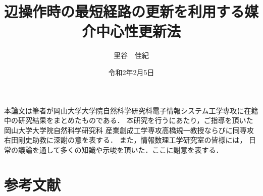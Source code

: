 \documentclass[11pt]{jreport}
\title{辺操作時の最短経路の更新を利用する媒介中心性更新法}
\author{里谷　佳紀}
\date{令和2年2月5日} %
\theoremstyle{mythmstyle}
\begin{document}
\maketitle








\acknowledgment
本論文は筆者が岡山大学大学院自然科学研究科電子情報システム工学専攻に在籍中の研究結果をまとめたものである．
本研究を行うにあたり，ご指導を頂いた岡山大学大学院自然科学研究科
産業創成工学専攻高橋規一教授ならびに同専攻右田剛史助教に深謝の意を表する．
また，情報数理工学研究室の皆様には，
日常の議論を通して多くの知識や示唆を頂いた．ここに謝意を表する．

\chapter*{参考文献}
\makeatletter
{}
\makeatother
\printbibliography[heading=none]
\end{document}
